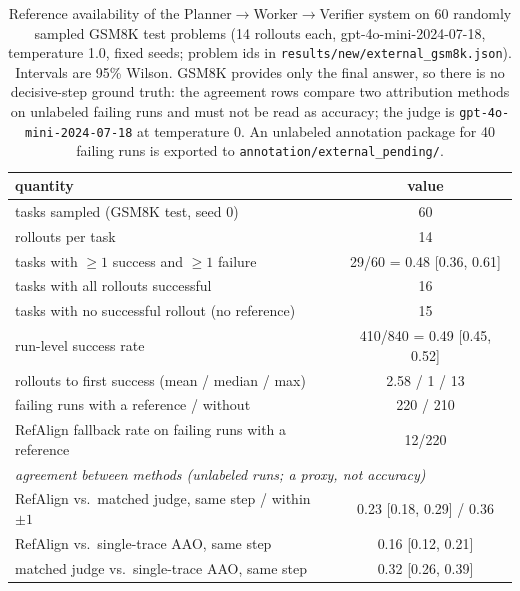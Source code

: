 \begin{table}[t]
\centering\small
\begin{tabular}{lc}
\toprule
quantity & value \\
\midrule
tasks sampled (GSM8K test, seed 0) & 60 \\
rollouts per task & 14 \\
tasks with $\ge 1$ success and $\ge 1$ failure & 29/60 = 0.48 [0.36, 0.61] \\
tasks with all rollouts successful & 16 \\
tasks with no successful rollout (no reference) & 15 \\
run-level success rate & 410/840 = 0.49 [0.45, 0.52] \\
rollouts to first success (mean / median / max) & 2.58 / 1 / 13 \\
failing runs with a reference / without & 220 / 210 \\
RefAlign fallback rate on failing runs with a reference & 12/220 \\
\midrule
\multicolumn{2}{l}{\emph{agreement between methods (unlabeled runs; a proxy, not accuracy)}} \\
RefAlign vs.\ matched judge, same step / within $\pm1$ & 0.23 [0.18, 0.29] / 0.36 \\
RefAlign vs.\ single-trace AAO, same step & 0.16 [0.12, 0.21] \\
matched judge vs.\ single-trace AAO, same step & 0.32 [0.26, 0.39] \\
\bottomrule
\end{tabular}
\caption{Reference availability of the Planner$\to$Worker$\to$Verifier system on 60 randomly
sampled GSM8K test problems (14 rollouts each, gpt-4o-mini-2024-07-18, temperature 1.0,
fixed seeds; problem ids in \texttt{results/new/external\_gsm8k.json}). Intervals are 95\% Wilson.
GSM8K provides only the final answer, so there is no decisive-step ground truth: the agreement rows compare
two attribution methods on unlabeled failing runs and must not be read as accuracy; the judge is
\texttt{gpt-4o-mini-2024-07-18} at temperature 0. An unlabeled annotation package for
40 failing runs is exported to \texttt{annotation/external\_pending/}.}
\label{tab:external-availability}
\end{table}
